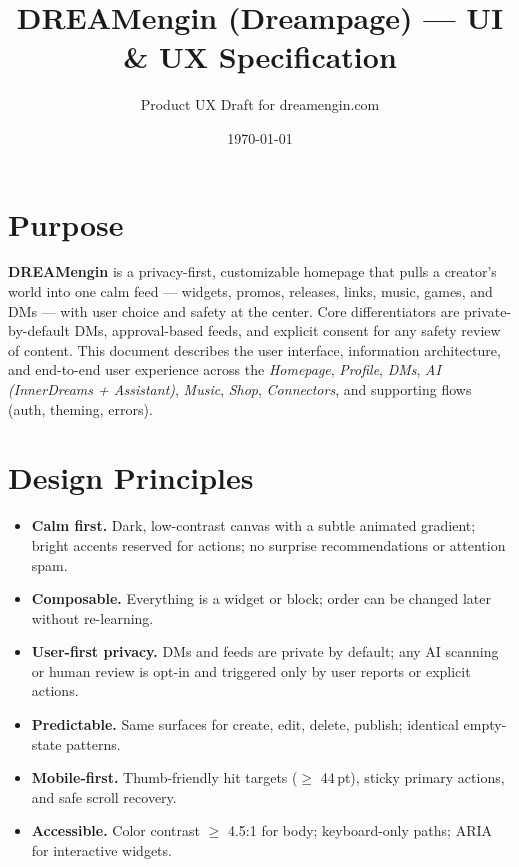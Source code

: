 \documentclass[11pt]{article}
\title{DREAMengin (Dreampage) --- UI \& UX Specification}
\author{Product UX Draft for dreamengin.com}
\date{\today}
\begin{document}
\maketitle

\section{Purpose}
\textbf{DREAMengin} is a privacy-first, customizable homepage that pulls a creator's world into one calm feed --- widgets, promos, releases, links, music, games, and DMs --- with user choice and safety at the center. Core differentiators are private-by-default DMs, approval-based feeds, and explicit consent for any safety review of content. This document describes the user interface, information architecture, and end-to-end user experience across the \emph{Homepage}, \emph{Profile}, \emph{DMs}, \emph{AI (InnerDreams + Assistant)}, \emph{Music}, \emph{Shop}, \emph{Connectors}, and supporting flows (auth, theming, errors).

\section{Design Principles}
\begin{itemize}
  \item \textbf{Calm first.} Dark, low-contrast canvas with a subtle animated gradient; bright accents reserved for actions; no surprise recommendations or attention spam.
  \item \textbf{Composable.} Everything is a widget or block; order can be changed later without re-learning.
  \item \textbf{User-first privacy.} DMs and feeds are private by default; any AI scanning or human review is opt-in and triggered only by user reports or explicit actions.
  \item \textbf{Predictable.} Same surfaces for create, edit, delete, publish; identical empty-state patterns.
  \item \textbf{Mobile-first.} Thumb-friendly hit targets ($\geq$ 44\,pt), sticky primary actions, and safe scroll recovery.
  \item \textbf{Accessible.} Color contrast $\geq$ 4.5:1 for body; keyboard-only paths; ARIA for interactive widgets.
\end{itemize}
\end{document}
